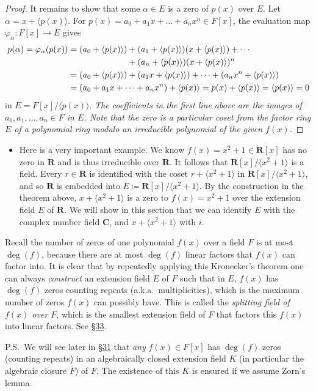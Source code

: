 \documentclass[11pt]{article}
\newcommand{\lk}[2]{\hyperlink{subsection.#1.#2}{\S#2}} %
\newcommand{\R}{\mathbf{R}}
\newcommand{\C}{\mathbf{C}}
\newcommand{\df}[1]{\textit{\textsf{#1}}}
\newcommand{\la}{\langle}
\newcommand{\ra}{\rangle}
\newcommand{\gen}[1]{\langle #1 \rangle}
\newcommand{\clos}[1]{\overline{#1}}
\renewcommand{\phi}{\varphi}
\begin{document}
\begin{itemize}
\begin{proof}
        It remains to show that some $\alpha \in E$ is a zero of $p(x)$ over $E$. Let $\alpha = x + \gen{p(x)}$. For $p(x) = a_0 + a_1x + \dots + a_n x^n \in F[x]$, the evaluation map $\phi_\alpha\colon F[x] \to E$ gives 
        \begin{align*}
            p(\alpha) = \phi_\alpha(p(x)) & = (a_0 + \gen{p(x)}) + (a_1 + \gen{p(x)})(x + \gen{p(x)}) + \cdots \\ & \hphantom{{}= (a_0 + \gen{p(x)})} + (a_n + \gen{p(x)})(x+\gen{p(x)})^n \\ & = (a_0 + \gen{p(x)}) + (a_1x + \gen{p(x)}) + \dots + (a_nx^n + \gen{p(x)}) \\ & = (a_0 + a_1x + \dots + a_n x^n) + \gen{p(x)} = p(x) + \gen{p(x)} = \gen{p(x)} = 0
        \end{align*}
        in $E = F[x]/\gen{p(x)}$. \emph{The coefficients in the first line above are the images of $a_0,a_1,\dots,a_n \in F$ in $E$. Note that the zero is a particular coset from the factor ring $E$ of a polynomial ring modulo an irreducible polynomial of the given $f(x)$.}
    \end{proof}
    \begin{itemize}
        \item Here is a very important example. We know $f(x) = x^2 + 1 \in \R[x]$ has no zero in $\R$ and is thus irreducible over $\R$. It follows that $\R[x]/\la x^2 + 1 \ra$ is a field. Every $r \in \R$ is identified with the coset $r + \la x^2 + 1 \ra$ in $\R[x]/\la x^2+1 \ra$, and so $\R$ is embedded into $E \coloneqq \R[x]/\la x^2+1 \ra$. By the construction in the theorem above, $x + \la x^2+1 \ra$ is a zero to $f(x) = x^2 + 1$ over the extension field $E$ of $\R$. We will show in this section that we can identify $E$ with the complex number field $\C$, and $x + \la x^2+1 \ra$ with $i$.
    \end{itemize}
\end{itemize}
    \begin{framed}
    Recall the number of zeros of one polynomial $f(x)$ over a field $F$ is at most $\deg(f)$, because there are at most $\deg(f)$ linear factors that $f(x)$ can factor into. It is clear that by repeatedly applying this Kronecker's theorem one can always \emph{construct} an extension field $E$ of $F$ such that in $E$, $f(x)$ has $\deg(f)$ zeros counting repeats (a.k.a.\ multiplicities), which is the maximum number of zeros $f(x)$ can possibly have. This is called the \df{splitting field of $f(x)$ over $F$}, which is the smallest extension field of $F$ that factors this $f(x)$ into linear factors. See \lk{6}{33}.
    
    P.S.\ We will see later in \lk{6}{31} that \emph{any} $f(x) \in F[x]$ has $\deg(f)$ zeros (counting repeats) in an algebraically closed extension field $K$ (in particular the algebraic closure $\clos{F}$) of $F$. The existence of this $K$ is ensured if we assume Zorn's lemma.
    \end{framed}
\end{document}
